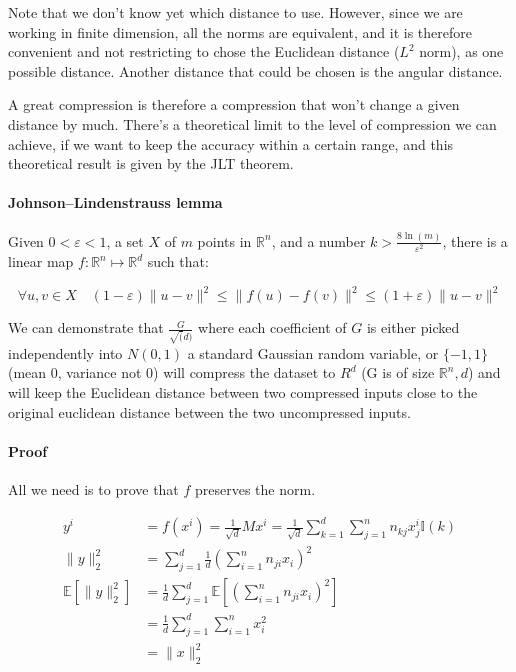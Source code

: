 \documentclass[11pt,a4paper]{article}
\begin{document}
	
	Note that we don't know yet which distance to use. However, since we are working in finite dimension, all the norms are equivalent, and it is therefore convenient and not restricting to chose the Euclidean distance ($L^2$ norm), as one possible distance. Another distance that could be chosen is the angular distance.
	
	A great compression is therefore a compression that won't change a given distance by much. There's a theoretical limit to the level of compression we can achieve, if we want to keep the accuracy within a certain range, and this theoretical result is given by the JLT theorem.
	
	
	\paragraph{Johnson–Lindenstrauss lemma}
	Given $0 < \varepsilon < 1$, a set $X$ of $m$ points in $\mathbb{R}^n$, and a number $k > \frac{8 \ln(m)}{\varepsilon^2}$, there is a linear map $f : \mathbb{R}^n \mapsto \mathbb{R}^d$ such that:
	
	\begin{equation}
		\forall u,v \in X \quad (1-\varepsilon)\|u-v\|^2 \leq \|f(u) - f(v)\|^2 \leq (1+\varepsilon)\|u-v\|^2
	\end{equation}
	

	We can demonstrate that $\frac{G}{\sqrt(d)}$ where each coefficient of $G$ is either picked independently into $N(0,1)$ a standard Gaussian random variable, or $\{-1,1\}$ (mean 0, variance not 0) will compress the dataset to $R^d$ (G is of size $\mathbb{R}^n,d$) and will keep the Euclidean distance between two compressed inputs close to the original euclidean distance between the two uncompressed inputs.
	
	\paragraph{Proof}
	All we need is to prove that $f$ preserves the norm. 
	
	\begin{align*}
		y^i  &= f(x^i) = \frac{1}{\sqrt{d}} M x^i = \frac{1}{\sqrt{d}} \sum_{k=1}^d \sum_{j=1}^{n} n_{kj} x_j^i \mathbb{I}(k)\\
		\|y \| _2^2 &= \sum_{j=1}^{d} \frac{1}{d} \left(\sum_{i=1}^{n} n_{ji} x_i \right)^2\\
		\mathbb{E}\left[\| y \|_2^2\right] &= \frac{1}{d}  \sum_{j=1}^{d} \mathbb{E} \left[\left(\sum_{i=1}^{n} n_{ji} x_i \right)^2\right]\\
		&= \frac{1}{d}  \sum_{j=1}^{d} \sum_{i=1}^{n} x_i^2 \\
		&= \|x\|^2_2
	\end{align*}
	
\end{document}
